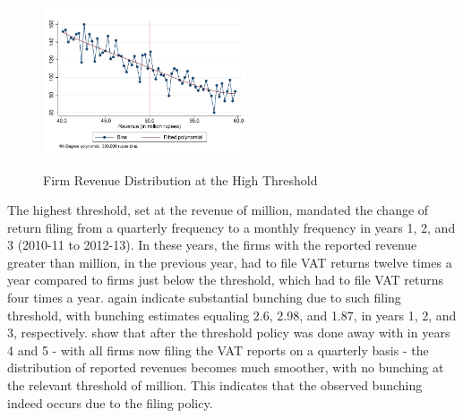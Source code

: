 \begin{figure}[t!]
{    \includegraphics[width=60mm]{graphs/BunchingYear5_50Million_Degree4_3lac}
    \label{fig:HighestThreshold-E}
    }
  \caption{Firm Revenue Distribution at the High Threshold}
  \label{fig:HighestThreshold}
\end{figure}

The highest threshold, set at the revenue of  million, mandated the change of return filing from a quarterly frequency to a monthly frequency in years 1, 2, and 3 (2010-11 to 2012-13). In these years, the firms with the reported revenue greater than  million, in the previous year, had to file VAT returns twelve times a year compared to firms just below the threshold, which had to file VAT returns four times a year.  again indicate substantial bunching due to such filing threshold, with bunching estimates equaling 2.6, 2.98, and 1.87, in years 1, 2, and 3, respectively.  show that after the threshold policy was done away with in years 4 and 5 - with all firms now filing the VAT reports on a quarterly basis - the distribution of reported revenues becomes much smoother, with no bunching at the relevant threshold of  million. This indicates that the observed bunching indeed occurs due to the filing policy.

